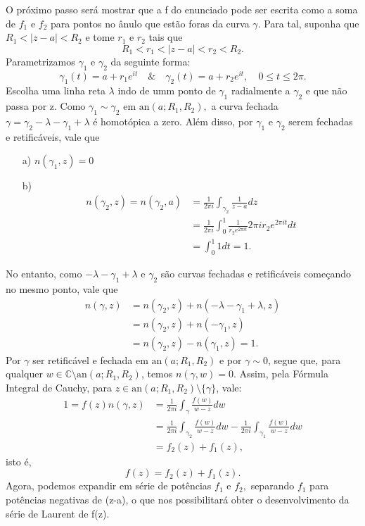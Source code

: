 \documentclass[ComplexAnalysis/complex.tex]{subfiles}
\begin{document}
\begin{proof*}
	O próximo passo será mostrar que a f do enunciado pode ser escrita como a soma de \(f_{1}\) e \(f_{2}\) para pontos no ânulo que estão
	foras da curva \(\gamma \). Para tal, suponha que \(R_{1} < |z-a| < R_{2}\) e tome \(r_1\) e \(r_{2}\) tais que
	\[
		R_{1} < r_{1} < |z-a| < r_{2} < R_{2}.
	\]
	Parametrizamos \(\gamma_{1}\) e \(\gamma_{2}\) da seguinte forma:
	\[
		\gamma _{1}(t) = a + r_{1}e^{it}\quad\&\quad \gamma_{2}(t) = a + r_{2}e^{it},\quad 0\leq t\leq 2\pi .
	\]
	Escolha uma linha reta \(\lambda \) indo de umm ponto de \(\gamma_{1}\) radialmente a \(\gamma _{2}\) e que não passa por z.
	Como \(\gamma _{1}\sim \gamma _{2}\) em \(\mathrm{an}(a; R_{1}, R_{2}),\) a curva fechada \(\gamma  = \gamma_{2} - \lambda -\gamma _{1} + \lambda \) é homotópica
	a zero. Além disso, por \(\gamma _{1}\) e \(\gamma _{2}\) serem fechadas e retificáveis, vale que
	\begin{itemize}
		\item[a)] \(n(\gamma_{1}, z) = 0\)
		\item[b)]
		      \begin{align*}
			      n(\gamma_{2}, z) = n(\gamma_{2}, a) & = \frac{1}{2\pi i}\int_{\gamma_{2}}^{}\frac{1}{z-a}dz                             \\
			                                          & = \frac{1}{2\pi i}\int_{0}^{1}\frac{1}{r_{2}e^{2\pi it}}2\pi ir_{2}e^{2\pi it }dt \\
			                                          & = \int_{0}^{1}1dt = 1.
		      \end{align*}
	\end{itemize}
	No entanto, como \(-\lambda -\gamma _{1}+\lambda \) e \(\gamma _{2}\) são curvas fechadas e retificáveis começando no mesmo ponto,
	vale que
	\begin{align*}
		n(\gamma , z) & = n(\gamma_{2}, z) + n (-\lambda -\gamma _{1} + \lambda , z) \\
		              & = n(\gamma_{2}, z) + n(-\gamma_{1}, z)                       \\
		              & = n(\gamma_{2}, z) - n(\gamma_{1}, z) = 1.
	\end{align*}
	Por \(\gamma \) ser retificável e fechada em \(\mathrm{an}(a; R_{1}, R_{2})\) e por \(\gamma \sim 0\), segue que, para
	qualquer \(w\in \mathbb{C}\setminus{\mathrm{an}(a; R_{1}, R_{2})}\), temos \(n(\gamma, w) = 0.\) Assim, pela Fórmula Integral de Cauchy,
	para \(z\in \mathrm{an}(a; R_{1}, R_{2})\setminus{\{\gamma \}}\), vale:
	\begin{align*}
		1 = f(z)n(\gamma , z) & = \frac{1}{2\pi i}\int_{\gamma }^{}\frac{f(w)}{w-z}dw                                                               \\
		                      & = \frac{1}{2\pi i}\int_{\gamma _{2}}^{}\frac{f(w)}{w-z}dw - \frac{1}{2\pi i}\int_{\gamma _{1}}^{}\frac{f(w)}{w-z}dw \\
		                      & = f_{2}(z) + f_{1}(z),
	\end{align*}
	isto é,
	\[
		f(z) = f_{2}(z) + f_{1}(z).
	\]
	Agora, podemos expandir em série de potências \(f_{1}\) e \(f_{2},\) separando \(f_{1}\) para potências negativas de (z-a), o que nos possibilitará obter
	o desenvolvimento da série de Laurent de f(z).


\end{proof*}
\end{document}
